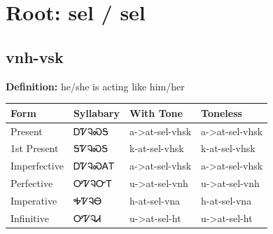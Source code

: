 \documentclass{article}%
\begin{document}
%
\normalsize%
\section*{Root: sel / sel}%
\subsection*{vnh-vsk}%
\textbf{Definition: }%
he/she is acting like him/her%
\\[0.5em]%
\begin{tabular}{|l|l|l|l|}%
\hline%
\textbf{Form}&\textbf{Syllabary}&\textbf{With Tone}&\textbf{Toneless}\\%
\hline%
Present&ᎠᏤᎸᏍᎦ&a{-}>at{-}sel{-}vhsk&a{-}>at{-}sel{-}vhsk\\%
1st Present&ᎦᏤᎸᏍᎦ&k{-}at{-}sel{-}vhsk&k{-}at{-}sel{-}vhsk\\%
Imperfective&ᎠᏤᎸᏍᎪᎢ&a{-}>at{-}sel{-}vhsk&a{-}>at{-}sel{-}vhsk\\%
Perfective&ᎤᏤᎸᏅᎢ&u{-}>at{-}sel{-}vnh&u{-}>at{-}sel{-}vnh\\%
Imperative&ᎭᏤᎸᎾ&h{-}at{-}sel{-}vna&h{-}at{-}sel{-}vna\\%
Infinitive&ᎤᏤᎸᏗ&u{-}>at{-}sel{-}ht&u{-}>at{-}sel{-}ht\\%
\hline%
\end{tabular}%
\\[1em]%
\end{document}
